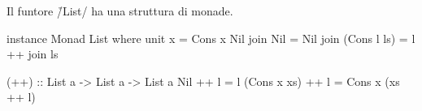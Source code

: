 \begin{frame}[fragile]
Il funtore \h/List/ ha una struttura di monade.
\begin{haskellcode}
instance Monad List where
    unit x = Cons x Nil
    join Nil = Nil
    join (Cons l ls) = l ++ join ls

(++) :: List a -> List a -> List a
Nil ++ l = l
(Cons x xs) ++ l = Cons x (xs ++ l)
\end{haskellcode}
\end{frame}